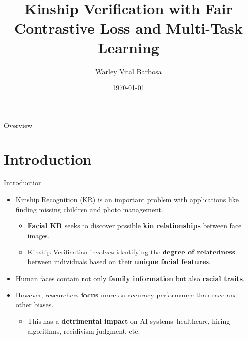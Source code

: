 \documentclass[aspectratio=169,xcolor=dvipsnames]{beamer}
\title[KFC]{Kinship Verification with Fair Contrastive Loss and Multi-Task Learning} %
\author[Barbosa, Warley .V]{Warley Vital Barbosa}
\date{\today} %
\begin{document}
\begin{frame}[plain]
    \titlepage
\end{frame}

\begin{frame}{Overview}
    \tableofcontents
\end{frame}

\section{Introduction}

\begin{frame}{Introduction}
    \begin{itemize} 
        \item Kinship Recognition (KR) is an important problem with applications like finding missing children and photo management. 
        \begin{itemize}
            \item \textbf{Facial KR} seeks to discover possible \textbf{kin relationships} between face images.
            \item Kinship Verification involves identifying the \textbf{degree of relatedness} between individuals based on their \textbf{unique facial features}.
        \end{itemize}
        \item Human faces contain not only \textbf{family information} but also \textbf{racial traits}.
        \item However, researchers \textbf{focus} more on accuracy performance than race and other biases.
        \begin{itemize}
            \item This has a \textbf{detrimental impact} on AI systems--healthcare, hiring algorithms, recidivism judgment, etc.
        \end{itemize}
    \end{itemize}
\end{frame}
\end{document}
